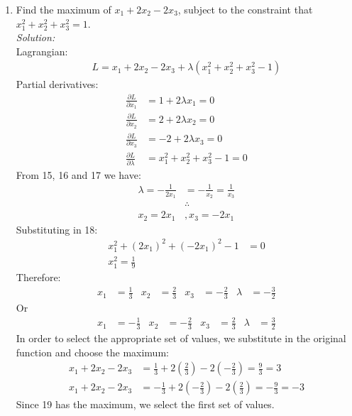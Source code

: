 \documentclass[12pt,a4paper]{article}
\begin{document}
\begin{enumerate}
\item Find the maximum of $x_1 + 2x_2 - 2x_3$, subject to the constraint  that $x_1^2+x_2^2+x_3^2 = 1$. \\
	\emph{Solution:} \\
		Lagrangian:
			\begin{align*}
			L = x_1 + 2x_2 - 2x_3 + \lambda (x_1^2 + x_2^2 + x_3^2 - 1)
			\end{align*}
		Partial derivatives:
			\begin{align}
			\frac{\partial L}{\partial x_1} &= 1 + 2\lambda x_1 = 0 \\
			\frac{\partial L}{\partial x_2} &= 2 + 2\lambda x_2 = 0 \\
			\frac{\partial L}{\partial x_3} &= -2 + 2\lambda x_3 = 0 \\
			\frac{\partial L}{\partial \lambda} &= x_1^2+x_2^2+x_3^2 - 1 = 0
			\end{align}
		From 15, 16 and 17 we have: 
			\begin{align*}
			\lambda = - \frac{1}{2x_1} &= - \frac{1}{x_2} = \frac{1}{x_3} \\
			&\therefore \\
			x_2 = 2x_1 &, 
			x_3 = -2x_1
			\end{align*}
		Substituting in 18:
			\begin{align*}
			x_1^2+ (2x_1)^2+ (-2x_1)^2 - 1 &= 0 \\
			x_1^2 = \frac{1}{9}
			\end{align*}
		Therefore:
			\begin{align*}
			x_1 &= \frac{1}{3} &
			x_2 &= \frac{2}{3} &
			x_3 &= -\frac{2}{3} &
			\lambda &=  - \frac{3}{2}
			\end{align*}
		Or
			\begin{align*}
			x_1 &= -\frac{1}{3} &
			x_2 &= -\frac{2}{3} &
			x_3 &= \frac{2}{3} &
			\lambda &=  \frac{3}{2}
			\end{align*}
		In order to select the appropriate set of values, we substitute in the original function and choose the maximum:
			\begin{align}
			x_1 + 2x_2 - 2x_3 &= \frac{1}{3} + 2(\frac{2}{3}) - 2(-\frac{2}{3}) = \frac{9}{3} = 3 \\
			x_1 + 2x_2 - 2x_3 &= -\frac{1}{3} + 2(-\frac{2}{3}) - 2(\frac{2}{3}) = -\frac{9}{3} = -3
			\end{align}
		Since 19 has the maximum, we select the first set of values.


\end{enumerate}
\end{document}
